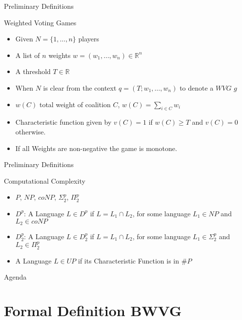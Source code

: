 \documentclass{beamer}
\begin{document}
\begin{frame}[fragile]{Preliminary Definitions}
  \begin{block}{Weighted Voting Games}
    \begin{itemize}
      \item Given $N = \{1,\dots,n\}$ players
      \item A list of $n$ weights $w = (w_1, \dots, w_n) \in \mathbb{R}^n$
      \item A threshold $T \in \mathbb{R}$
      \item When $N$ is clear from the context $q = (T; w_1, \dots, w_n)$ to denote a $WVG$ $g$
      \item $w(C)$ total weight of coalition $C$, $w(C) = \sum_{i \in C} w_i$ 
      \item Characteristic function given by $v(C) = 1$ if $w(C) \geq T$ and $v(C) = 0$ otherwise.
      \item If all Weights are non-negative the game is monotone.
    \end{itemize}
  \end{block}
\end{frame}

\begin{frame}[fragile]{Preliminary Definitions}
  \begin{block}{Computational Complexity}
    \begin{itemize}
      \item $P$, $NP$, $coNP$, $\Sigma_2^p$, $\Pi_2^p$
      \item $D^p$: A Language $L \in D^p$ if $L = L_1 \cap L_2$, for some language $L_1 \in NP$ and $L_2 \in coNP$
      \item $D_2^p$: A Language $L \in D_2^p$ if $L = L_1 \cap L_2$, for some language $L_1 \in \Sigma_2^p$ and $L_2 \in \Pi_2^p$
      \item A Language $L \in UP$ if its Characteristic Function is in $\# P$
    \end{itemize}
  \end{block}
\end{frame}

\begin{frame}[fragile]{Agenda}
  \section{Formal Definition BWVG}
  \tableofcontents[currentsection]
\end{frame}
\end{document}
